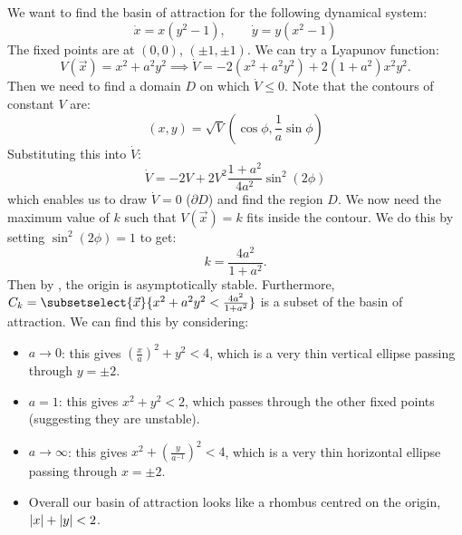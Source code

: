 \documentclass[../Main.tex]{subfiles}
\begin{document}
\begin{example}
    We want to find the basin of attraction for the following dynamical system:
    \begin{equation*}
        \dot{x} = x(y^2 - 1),\qquad \dot{y} = y(x^2 - 1)
    \end{equation*}
    The fixed points are at $(0, 0)$, $(\pm 1, \pm 1)$. We can try a Lyapunov function:
    \begin{equation*}
        V(\vec{x}) = x^2 + a^2y^2 \implies \dot{V} = -2(x^2 + a^2 y^2) + 2(1 + a^2) x^2y^2.
    \end{equation*}
    Then we need to find a domain $D$ on which $\dot{V} \leq 0$. Note that the contours of constant $V$ are:
    \begin{equation*}
        (x, y) = \sqrt{V} \left(\cos\phi, \frac1a\sin\phi\right)
    \end{equation*}
    Substituting this into $\dot{V}$:
    \begin{equation*}
        \dot{V} = -2V + 2V^2 \frac{1+a^2}{4a^2} \sin^2(2\phi)
    \end{equation*}
    which enables us to draw $\dot{V} = 0$ ($\partial D$) and find the region $D$. We now need the maximum value of $k$ such that $V(\vec{x}) = k$ fits inside the contour. We do this by setting $\sin^2(2\phi) = 1$ to get:
    \begin{equation*}
        k = \frac{4a^2}{1+a^2}.
    \end{equation*}
    Then by , the origin is asymptotically stable. Furthermore, $C_k = \subsetselect{\vec{x}}{x^2 + a^2 y^2 < \frac{4a^2}{1+a^2}}$ is a subset of the basin of attraction. We can find this by considering:
    \begin{itemize}
        \item $a \to 0$: this gives $\left(\frac{x}{a}\right)^2 + y^2 < 4$, which is a very thin vertical ellipse passing through $y = \pm 2$.
        \item $a = 1$: this gives $x^2 + y^2 < 2$, which passes through the other fixed points (suggesting they are unstable).
        \item $a \to \infty$: this gives $x^2 + \left(\frac{y}{a^{-1}}\right)^2 < 4$, which is a very thin horizontal ellipse passing through $x = \pm 2$.
        \item Overall our basin of attraction looks like a rhombus centred on the origin, $\left|x\right| + \left|y\right| < 2$.
    \end{itemize}
\end{example}
\end{document}
